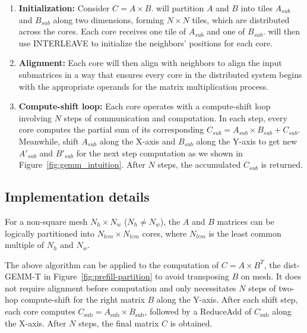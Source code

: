 \begin{enumerate}[label=(\arabic*), leftmargin=0.5cm, noitemsep,topsep=0pt]
\item \textbf{Initialization:} Consider $C = A \times B$. \gemm will partition $A$ and $B$ into tiles $A_{sub}$ and $B_{sub}$ along two dimensions, forming $N \times N$ tiles, which are distributed across the cores. Each core receives one tile of $A_{sub}$ and one of $B_{sub}$. \gemm will then use INTERLEAVE to initialize the neighbors' positions for each core. 

\item \textbf{Alignment:}  
Each core will then align with neighbors to align the input submatrices in a way that ensures every core in the distributed system begins with the appropriate operands for the matrix multiplication process. 

\item \textbf{Compute-shift loop:}  
Each core operates with a compute-shift loop involving $N$ steps of communication and computation. In each step, every core computes the partial sum of its corresponding $C_{sub} = A_{sub} \times B_{sub} + C_{sub}$. Meanwhile, shift $A_{sub}$ along the X-axis and $B_{sub}$ along the Y-axis to get new $A'_{sub}$ 
 and $B'_{sub}$ for the next step computation as  we shown in Figure~\ref{fig:gemm_intuition}. After $N$ steps, the accumulated $C_{sub}$ is returned.
\end{enumerate}

\vspace{-0.3cm}
\subsection{Implementation details}

 For a non-square mesh $N_h \times N_w$ ($N_h \neq N_w$), the $A$ and $B$ matrices can be logically partitioned into $N_{lcm} \times N_{lcm}$ cores, where $N_{lcm}$ is the least common multiple of $N_h$ and $N_w$.

 The above algorithm %
can be applied to the computation of $C = A \times B^T$, the dist-GEMM-T in Figure~\ref{fig:prefill-partition} to avoid transposing $B$ on mesh. It does not require alignment before computation and only necessitates $N$ steps of two-hop compute-shift for the right matrix $B$ along the Y-axis. After each shift step, each core computes $C_{\text{sub}} = A_{\text{sub}} \times B_{\text{sub}}$, followed by a ReduceAdd of $C_{\text{sub}}$ along the X-axis. After $N$ steps, the final matrix $C$ is obtained.